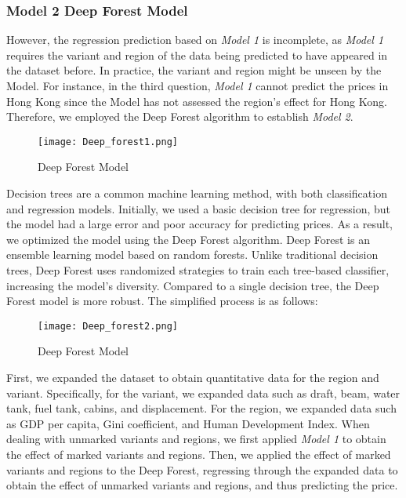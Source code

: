 \documentclass[12pt]{article}  %
\begin{document}
\subsubsection{Model 2 \textemdash  Deep Forest Model}


However, the regression prediction based on \emph{Model 1} is incomplete, as \emph{Model 1} requires the variant and region of the data being predicted to have appeared in the dataset before. In practice, the variant and region might be unseen by the Model. For instance, in the third question, \emph{Model 1} cannot predict the prices in Hong Kong since the Model has not assessed the region's effect for Hong Kong. Therefore, we employed the Deep Forest algorithm to establish \emph{Model 2}.

\begin{figure}[htbp]
    \centering
    \texttt{[image: Deep\_forest1.png]}
    \caption{Deep Forest Model}\label{fig:DF1}
\end{figure}

Decision trees are a common machine learning method, with both classification and regression models. Initially, we used a basic decision tree for regression, but the model had a large error and poor accuracy for predicting prices. As a result, we optimized the model using the Deep Forest algorithm. Deep Forest is an ensemble learning model based on random forests. Unlike traditional decision trees, Deep Forest uses randomized strategies to train each tree-based classifier, increasing the model's diversity. Compared to a single decision tree, the Deep Forest model is more robust. The simplified process is as follows:

\begin{figure}[htbp]
    \centering
    \texttt{[image: Deep\_forest2.png]}
    \caption{Deep Forest Model}\label{fig:DF2}
\end{figure}


First, we expanded the dataset to obtain quantitative data for the region and variant. Specifically, for the variant, we expanded data such as draft, beam, water tank, fuel tank, cabins, and displacement. For the region, we expanded data such as GDP per capita, Gini coefficient, and Human Development Index. When dealing with unmarked variants and regions, we first applied \emph{Model 1} to obtain the effect of marked variants and regions. Then, we applied the effect of marked variants and regions to the Deep Forest, regressing through the expanded data to obtain the effect of unmarked variants and regions, and thus predicting the price.
\end{document}

